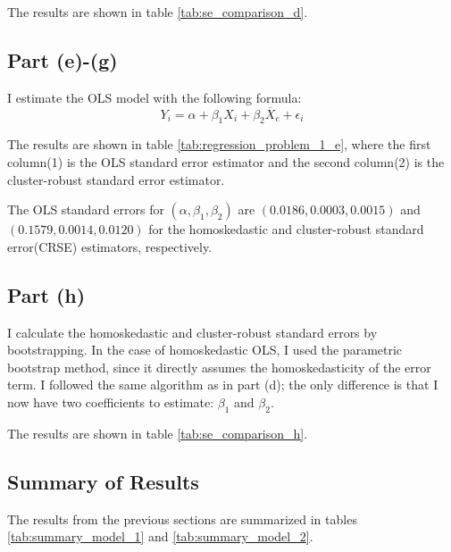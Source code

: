 \documentclass[12pt]{article}
\begin{document}
The results are shown in table \ref{tab:se_comparison_d}.



\newpage

\subsection{Part (e)-(g)}
I estimate the OLS model with the following formula:
\begin{equation}
    Y_i = \alpha + \beta_1 X_i + \beta_2 \overline{X}_c + \epsilon_i
\end{equation}

The results are shown in table \ref{tab:regression_problem_1_e}, where the first column(1) is the OLS standard error estimator and the second column(2) is the cluster-robust standard error estimator.



The OLS standard errors for $(\alpha, \beta_1, \beta_2)$ are $(0.0186, 0.0003, 0.0015)$ and $(0.1579, 0.0014, 0.0120)$ for the homoskedastic and cluster-robust standard error(CRSE) estimators, respectively.

\newpage

\subsection{Part (h)}
I calculate the homoskedastic and cluster-robust standard errors by bootstrapping.
In the case of homoskedastic OLS, I used the parametric bootstrap method, since it directly assumes the homoskedasticity of the error term.
I followed the same algorithm as in part (d); the only difference is that I now have two coefficients to estimate: $\beta_1$ and $\beta_2$.

The results are shown in table \ref{tab:se_comparison_h}.



\subsection{Summary of Results}
The results from the previous sections are summarized in tables \ref{tab:summary_model_1} and \ref{tab:summary_model_2}.
\end{document}
